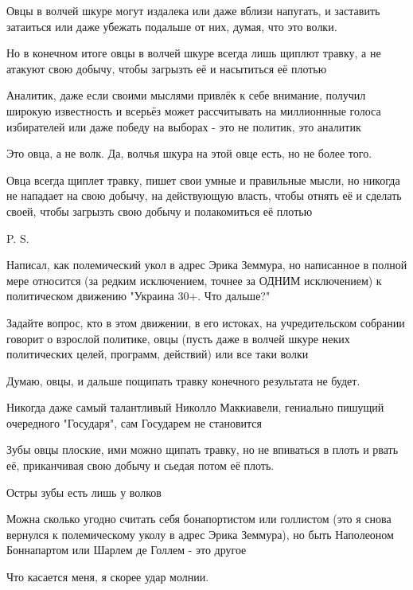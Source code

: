 \begin{itemize}
 

Овцы в волчей шкуре могут издалека или даже вблизи напугать, и заставить
затаиться или даже убежать подальше от них, думая, что это волки.

Но в конечном итоге овцы в волчей шкуре всегда лишь щиплют травку, а не атакуют
свою добычу, чтобы загрызть её и насытиться её плотью

Аналитик, даже если своими мыслями привлёк к себе внимание, получил широкую
известность и всерьёз может рассчитывать на миллионнные голоса избирателей или
даже победу на выборах - это не политик, это аналитик

Это овца, а не волк. Да, волчья шкура на этой овце есть, но не более того.

Овца всегда щиплет травку, пишет свои умные и правильные мысли, но никогда не
нападает на свою добычу, на действующую власть, чтобы отнять её и сделать
своей, чтобы загрызть свою добычу и полакомиться её плотью

P. S.

Написал, как полемический укол в адрес Эрика Земмура, но написанное в полной
мере относится (за редким исключением, точнее за ОДНИМ исключением) к
политическом движению "Украина 30+. Что дальше?"

Задайте вопрос, кто в этом движении, в его истоках, на учредительском собрании
говорит о взрослой политике, овцы (пусть даже в волчей шкуре неких политических
целей, программ, действий) или все таки волки

Думаю, овцы, и дальше пощипать травку конечного результата не будет.

Никогда даже самый талантливый Николло Маккиавели, гениально пишущий очередного
"Государя", сам Государем не становится

Зубы овцы плоские, ими можно щипать травку, но не впиваться в плоть и рвать её,
приканчивая свою добычу и сьедая потом её плоть.

Остры зубы есть лишь у волков

Можна сколько угодно считать себя бонапортистом или голлистом (это я снова
вернулся к полемическому уколу в адрес Эрика Земмура), но быть Наполеоном
Боннапартом или Шарлем де Голлем - это другое

Что касается меня, я скорее удар молнии.


\end{itemize}
